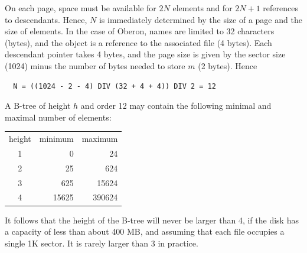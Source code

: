 On each page, space must be available for $2N$ elements and for $2N + 1$ references to descendants.
Hence, $N$ is immediately determined by the size of a page and the size of elements.  In the case of
Oberon, names are limited to 32 characters (bytes), and the object is a reference to the associated file
(4 bytes). Each descendant pointer takes 4 bytes, and the page size is given by the sector size (1024)
minus the number of bytes needed to store $m$ (2 bytes).  Hence
\begin{verbatim}
  N = ((1024 - 2 - 4) DIV (32 + 4 + 4)) DIV 2 = 12
\end{verbatim}
A B-tree of height $h$ and order 12 may contain the following minimal and maximal number of elements:
\begin{table}
  \centering
  \begin{tabular}{c r r}
    height & minimum & maximum \\
    1      &       0 &      24 \\
    2      &      25 &     624 \\
    3      &     625 &   15624 \\
    4      &   15625 &  390624 \\
  \end{tabular}
\end{table}

It follows that the height of the B-tree will never be larger than 4, if the disk has a capacity of less
than about 400 MB, and assuming that each file occupies a single 1K sector. It is rarely larger than 3
in practice.

